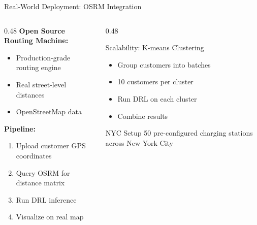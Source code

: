 \documentclass[aspectratio=169,11pt]{beamer}
\begin{document}
\begin{frame}{Real-World Deployment: OSRM Integration}
    \begin{columns}[T]
        \begin{column}{0.48\textwidth}
            \textbf{Open Source Routing Machine:}
            \begin{itemize}
                \item Production-grade routing engine
                \item Real street-level distances
                \item OpenStreetMap data
            \end{itemize}

            \vspace{0.3cm}
            \textbf{Pipeline:}
            \begin{enumerate}
                \item Upload customer GPS coordinates
                \item Query OSRM for distance matrix
                \item Run DRL inference
                \item Visualize on real map
            \end{enumerate}
        \end{column}
        \begin{column}{0.48\textwidth}
            \begin{block}{Scalability: K-means Clustering}
                \begin{itemize}
                    \item Group customers into batches
                    \item 10 customers per cluster
                    \item Run DRL on each cluster
                    \item Combine results
                \end{itemize}
            \end{block}

            \begin{exampleblock}{NYC Setup}
                50 pre-configured charging stations across New York City
            \end{exampleblock}
        \end{column}
    \end{columns}
\end{frame}
\end{document}
